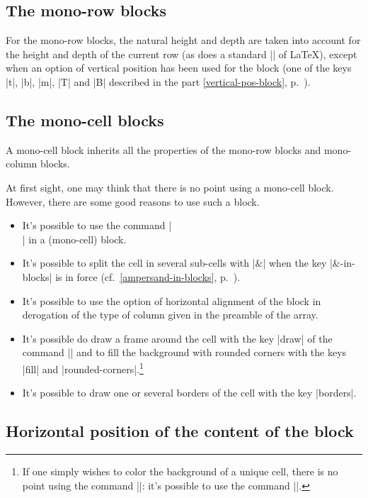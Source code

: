 \documentclass[dvipsnames]{article}
\begin{document}
\subsection{The mono-row blocks}

For the mono-row blocks, the natural height and depth are taken into account
for the height and depth of the current row (as does a standard |\multicolumn|
of LaTeX), except when an option of vertical position has been used for the block
(one of the keys |t|, |b|, |m|, |T| and |B| described in the part
\ref{vertical-pos-block}, p.~\pageref{vertical-pos-block}).

\subsection{The mono-cell blocks}

A mono-cell block inherits all the properties of the mono-row blocks and
mono-column blocks.

\medskip
At first sight, one may think that there is no point using a mono-cell block.
However, there are some good reasons to use such a block.
\begin{itemize}
\item It's possible to use the command |\\| in a (mono-cell) block.

\item It's possible to split the cell in several sub-cells with |&| when the
key |&-in-blocks| is in force (cf.~\ref{ampersand-in-blocks}, p.~\pageref{ampersand-in-blocks}).

\item It's possible to use the option of horizontal alignment of the block in
derogation of the type of column given in the preamble of the array.

\item It's possible do draw a frame around the cell with the key |draw| of the
command |\Block| and to fill the background with rounded corners with the keys
|fill| and |rounded-corners|.\footnote{If one simply wishes to color the
background of a unique cell, there is no point using the command |\Block|:
it's possible to use the command |\cellcolor|.}

\item It's possible to draw one or several borders of the cell with the key |borders|.
\end{itemize}



\subsection{Horizontal position of the content of the block}
\end{document}
